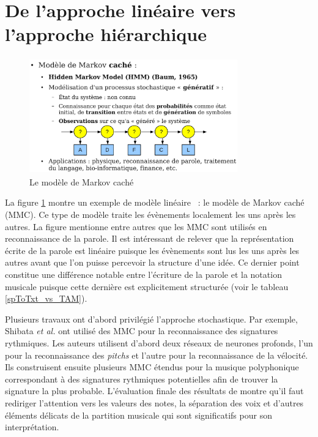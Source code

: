 \section{De l’approche linéaire vers l’approche hiérarchique}

\begin{figure}[h]
	\centering
	\includegraphics[height=50mm, width=90mm]{
    z_images/2_etat_de_l_art/0_hmm.png}
	\caption[Le modèle de Markov caché]{Le modèle de Markov caché\footnotemark}
    \label{mmc}
\end{figure}

La figure \ref{mmc} montre un exemple de modèle linéaire~ : le modèle de Markov
caché (MMC). Ce type de modèle traite les évènements localement les uns après les
autres. La figure mentionne entre autres que les MMC sont utilisés en
reconnaissance de la parole. Il est intéressant de relever que la
représentation écrite de la parole est linéaire puisque les évènements sont lus
les uns après les autres avant que l’on puisse percevoir la structure d’une
idée. Ce dernier point constitue une différence notable entre l’écriture de la
parole et la notation musicale puisque cette dernière est explicitement
structurée (voir le tableau \ref{spToTxt_vs_TAM}).

Plusieurs travaux ont d’abord privilégié l’approche stochastique. Par exemple,
Shibata \textit{et al.} \cite{shibata} ont utilisé des MMC pour la
reconnaissance des signatures rythmiques. Les auteurs utilisent d’abord deux
réseaux de neurones profonds, l’un pour la reconnaissance des \textit{pitchs}
et l’autre pour la reconnaissance de la vélocité. Ils construisent ensuite
plusieurs MMC étendus pour la musique polyphonique correspondant à des
signatures rythmiques potentielles afin de trouver la signature la plus
probable. L’évaluation finale des résultats de \cite{shibata} montre
qu’il faut  rediriger l’attention vers les
valeurs des notes, la séparation des voix et d’autres éléments délicats de la
partition musicale qui sont significatifs pour son interprétation.

